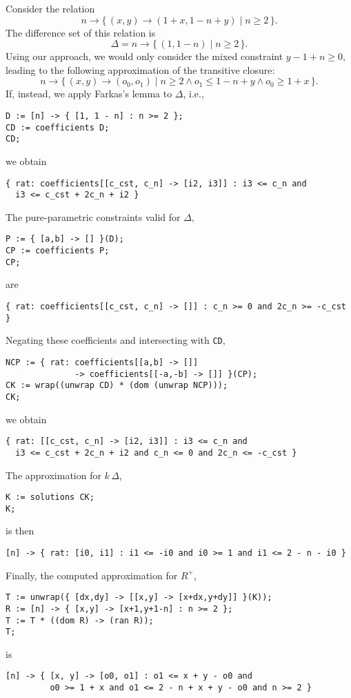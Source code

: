 \begin{example}
Consider the relation
$$
n \to \{\, (x, y) \to (1 + x, 1 - n + y) \mid n \ge 2 \,\}
.
$$
The difference set of this relation is
$$
\Delta = n \to \{\, (1, 1 - n) \mid n \ge 2 \,\}
.
$$
Using our approach, we would only consider the mixed constraint
$y - 1 + n \ge 0$, leading to the following approximation of the
transitive closure:
$$
n \to \{\, (x, y) \to (o_0, o_1) \mid n \ge 2 \wedge o_1 \le 1 - n + y \wedge o_0 \ge 1 + x \,\}
.
$$
If, instead, we apply Farkas's lemma to $\Delta$, i.e.,
\begin{verbatim}
D := [n] -> { [1, 1 - n] : n >= 2 };
CD := coefficients D;
CD;
\end{verbatim}
we obtain
\begin{verbatim}
{ rat: coefficients[[c_cst, c_n] -> [i2, i3]] : i3 <= c_n and
  i3 <= c_cst + 2c_n + i2 }
\end{verbatim}
The pure-parametric constraints valid for $\Delta$,
\begin{verbatim}
P := { [a,b] -> [] }(D);
CP := coefficients P;
CP;
\end{verbatim}
are
\begin{verbatim}
{ rat: coefficients[[c_cst, c_n] -> []] : c_n >= 0 and 2c_n >= -c_cst }
\end{verbatim}
Negating these coefficients and intersecting with \verb+CD+,
\begin{verbatim}
NCP := { rat: coefficients[[a,b] -> []]
              -> coefficients[[-a,-b] -> []] }(CP);
CK := wrap((unwrap CD) * (dom (unwrap NCP)));
CK;
\end{verbatim}
we obtain
\begin{verbatim}
{ rat: [[c_cst, c_n] -> [i2, i3]] : i3 <= c_n and
  i3 <= c_cst + 2c_n + i2 and c_n <= 0 and 2c_n <= -c_cst }
\end{verbatim}
The approximation for $k\,\Delta$,
\begin{verbatim}
K := solutions CK;
K;
\end{verbatim}
is then
\begin{verbatim}
[n] -> { rat: [i0, i1] : i1 <= -i0 and i0 >= 1 and i1 <= 2 - n - i0 }
\end{verbatim}
Finally, the computed approximation for $R^+$,
\begin{verbatim}
T := unwrap({ [dx,dy] -> [[x,y] -> [x+dx,y+dy]] }(K));
R := [n] -> { [x,y] -> [x+1,y+1-n] : n >= 2 };
T := T * ((dom R) -> (ran R));
T;
\end{verbatim}
is
\begin{verbatim}
[n] -> { [x, y] -> [o0, o1] : o1 <= x + y - o0 and
         o0 >= 1 + x and o1 <= 2 - n + x + y - o0 and n >= 2 }
\end{verbatim}
\end{example}

